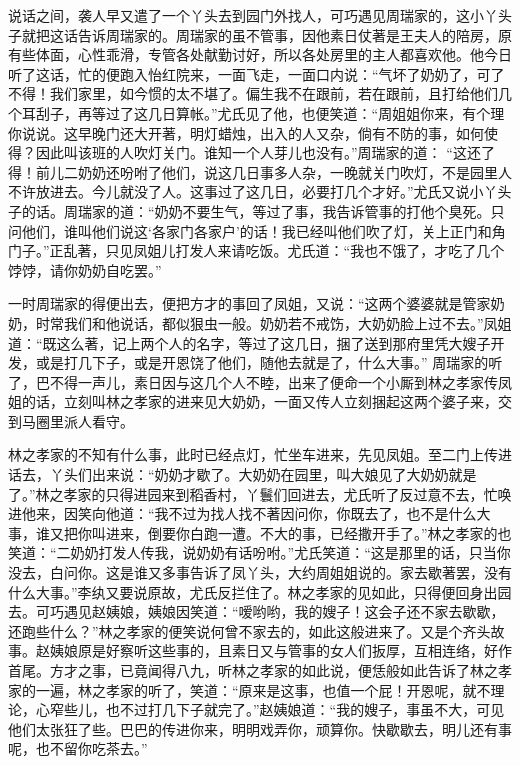 \begin{parag}
    说话之间，袭人早又遣了一个丫头去到园门外找人，可巧遇见周瑞家的，这小丫头子就把这话告诉周瑞家的。周瑞家的虽不管事，因他素日仗著是王夫人的陪房，原有些体面，心性乖滑，专管各处献勤讨好，所以各处房里的主人都喜欢他。他今日听了这话，忙的便跑入怡红院来，一面飞走，一面口内说：“气坏了奶奶了，可了不得！我们家里，如今惯的太不堪了。偏生我不在跟前，若在跟前，且打给他们几个耳刮子，再等过了这几日算帐。”尤氏见了他，也便笑道：“周姐姐你来，有个理你说说。这早晚门还大开著，明灯蜡烛，出入的人又杂，倘有不防的事，如何使得？因此叫该班的人吹灯关门。谁知一个人芽儿也没有。”周瑞家的道： “这还了得！前儿二奶奶还吩咐了他们，说这几日事多人杂，一晚就关门吹灯，不是园里人不许放进去。今儿就没了人。这事过了这几日，必要打几个才好。”尤氏又说小丫头子的话。周瑞家的道：“奶奶不要生气，等过了事，我告诉管事的打他个臭死。只问他们，谁叫他们说这‘各家门各家户’的话！我已经叫他们吹了灯，关上正门和角门子。”正乱著，只见凤姐儿打发人来请吃饭。尤氏道：“我也不饿了，才吃了几个饽饽，请你奶奶自吃罢。”
\end{parag}


\begin{parag}
    一时周瑞家的得便出去，便把方才的事回了凤姐，又说：“这两个婆婆就是管家奶奶，时常我们和他说话，都似狠虫一般。奶奶若不戒饬，大奶奶脸上过不去。”凤姐道：“既这么著，记上两个人的名字，等过了这几日，捆了送到那府里凭大嫂子开发，或是打几下子，或是开恩饶了他们，随他去就是了，什么大事。” 周瑞家的听了，巴不得一声儿，素日因与这几个人不睦，出来了便命一个小厮到林之孝家传凤姐的话，立刻叫林之孝家的进来见大奶奶，一面又传人立刻捆起这两个婆子来，交到马圈里派人看守。
\end{parag}


\begin{parag}
    林之孝家的不知有什么事，此时已经点灯，忙坐车进来，先见凤姐。至二门上传进话去，丫头们出来说：“奶奶才歇了。大奶奶在园里，叫大娘见了大奶奶就是了。”林之孝家的只得进园来到稻香村，丫鬟们回进去，尤氏听了反过意不去，忙唤进他来，因笑向他道：“我不过为找人找不著因问你，你既去了，也不是什么大事，谁又把你叫进来，倒要你白跑一遭。不大的事，已经撒开手了。”林之孝家的也笑道：“二奶奶打发人传我，说奶奶有话吩咐。”尤氏笑道：“这是那里的话，只当你没去，白问你。这是谁又多事告诉了凤丫头，大约周姐姐说的。家去歇著罢，没有什么大事。”李纨又要说原故，尤氏反拦住了。林之孝家的见如此，只得便回身出园去。可巧遇见赵姨娘，姨娘因笑道：“嗳哟哟，我的嫂子！这会子还不家去歇歇，还跑些什么？”林之孝家的便笑说何曾不家去的，如此这般进来了。又是个齐头故事。赵姨娘原是好察听这些事的，且素日又与管事的女人们扳厚，互相连络，好作首尾。方才之事，已竟闻得八九，听林之孝家的如此说，便恁般如此告诉了林之孝家的一遍，林之孝家的听了，笑道：“原来是这事，也值一个屁！开恩呢，就不理论，心窄些儿，也不过打几下子就完了。”赵姨娘道：“我的嫂子，事虽不大，可见他们太张狂了些。巴巴的传进你来，明明戏弄你，顽算你。快歇歇去，明儿还有事呢，也不留你吃茶去。”
\end{parag}


